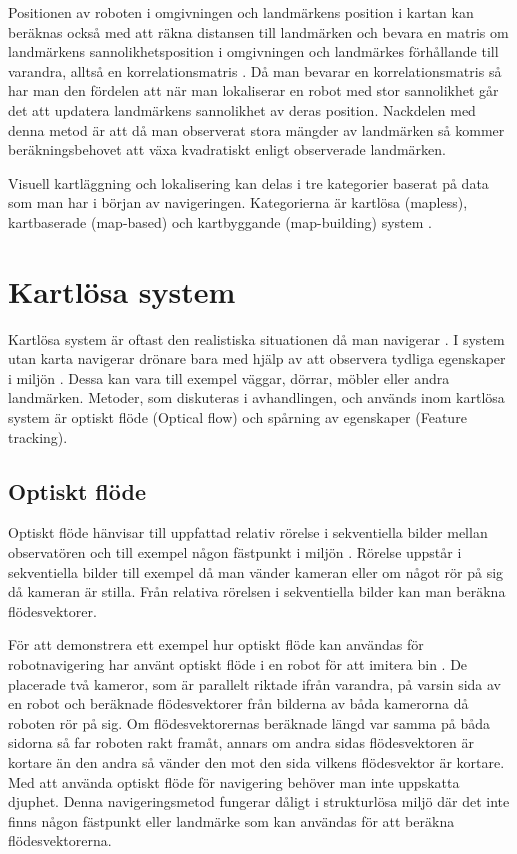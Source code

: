Positionen av roboten i omgivningen och landmärkens position i kartan kan beräknas också med att räkna distansen till landmärken och bevara en matris om landmärkens sannolikhetsposition i omgivningen och landmärkes förhållande till varandra, alltså en korrelationsmatris \citep{realslamproblem, ProbabilisticRobotics}. Då man bevarar en korrelationsmatris så har man den fördelen att när man lokaliserar en robot med stor sannolikhet går det att updatera landmärkens sannolikhet av deras position. Nackdelen med denna metod är att då man observerat stora mängder av landmärken så kommer beräkningsbehovet att växa kvadratiskt enligt observerade landmärken. 

Visuell kartläggning och lokalisering kan delas i tre kategorier baserat på data som man har i början av navigeringen. Kategorierna är kartlösa (mapless), kartbaserade (map-based) och kartbyggande (map-building) system \citep{geospatial}. 

\section{Kartlösa system}

Kartlösa system är oftast den realistiska situationen då man navigerar \citep{ProbabilisticRobotics}. I system utan karta navigerar drönare bara med hjälp av att observera tydliga egenskaper i miljön \citep{982903}. Dessa kan vara till exempel väggar, dörrar, möbler eller andra landmärken. Metoder, som diskuteras i avhandlingen, och används inom kartlösa system är optiskt flöde (Optical flow) och spårning av egenskaper (Feature tracking). 

\subsection{Optiskt flöde}

Optiskt flöde hänvisar till uppfattad relativ rörelse i sekventiella bilder mellan observatören och till exempel någon fästpunkt i miljön \citep{opticalflowuav}. Rörelse uppstår i sekventiella bilder till exempel då man vänder kameran eller om något rör på sig då kameran är stilla. Från relativa rörelsen i sekventiella bilder kan man beräkna flödesvektorer.

För att demonstrera ett exempel hur optiskt flöde kan användas för robotnavigering har \cite{341094} använt optiskt flöde i en robot för att imitera bin \citep{341094}. De placerade två kameror, som är parallelt riktade ifrån varandra, på varsin sida av en robot och beräknade flödesvektorer från bilderna av båda kamerorna då roboten rör på sig. Om flödesvektorernas beräknade längd var samma på båda sidorna så far roboten rakt framåt, annars om andra sidas flödesvektoren är kortare än den andra så vänder den mot den sida vilkens flödesvektor är kortare. Med att använda optiskt flöde för navigering behöver man inte uppskatta djuphet. Denna navigeringsmetod fungerar dåligt i strukturlösa miljö där det inte finns någon fästpunkt eller landmärke som kan användas för att beräkna flödesvektorerna. 

